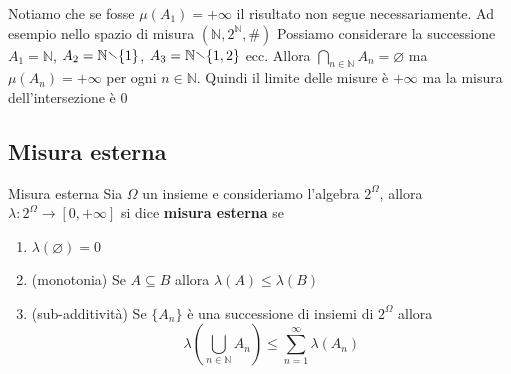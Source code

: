 \begin{remark}
    Notiamo che se fosse \(\mu(A_{1}) = +\infty\) il risultato non segue
    necessariamente. Ad esempio nello spazio di misura \((\mathbb{N},
    2^{\mathbb{N}}, \#)\) Possiamo considerare la successione \(A_{1} =
    \mathbb{N}\), \(A_{2} = \mathbb{N} \sminus \{1\} \), \(A_{3} = \mathbb{N}
    \sminus \{1, 2\} \) ecc. Allora \(\bigcap_{n \in \mathbb{N}} A_{n} =
    \varnothing\) ma \(\mu(A_{n}) = +\infty\) per ogni \(n \in \mathbb{N}\).
    Quindi il limite delle misure è \(+\infty\) ma la misura dell'intersezione è
    \(0\) 
\end{remark}

\newpage
\subsection{Misura esterna}
\begin{definition}{Misura esterna}
    Sia \(\Omega\) un insieme e consideriamo l'algebra \(2^{\Omega}\), allora
    \(\lambda : 2^{\Omega} \to [0, +\infty]\) si dice \textbf{misura esterna} se 
\begin{enumerate}[label = \arabic*.]
    \item \(\lambda(\varnothing) = 0\) 
    \item (monotonia) Se \(A \subseteq B \) allora \(\lambda(A) \le \lambda(B)\)
    \item (sub-additività) Se \(\{A_{n}\} \) è una successione di insiemi di
        \(2^{\Omega}\) allora \[\lambda\left( \bigcup_{n \in \mathbb{N}} A_{n}
        \right) \le \sum_{n=1}^{\infty} \lambda(A_{n})\]
\end{enumerate}
\end{definition}

